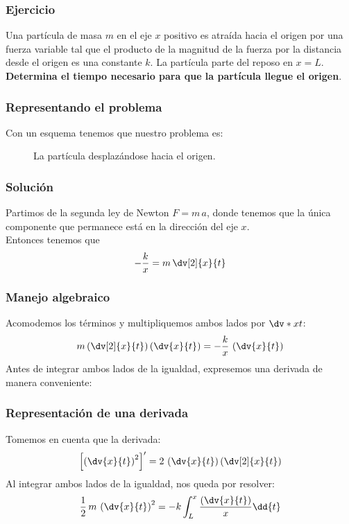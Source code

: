 \begin{frame}
\frametitle{Ejercicio}
Una partícula de masa $m$ en el eje $x$ positivo es atraída hacia el origen por una fuerza variable tal que el producto de la magnitud de la fuerza por la distancia desde el origen es una constante $k$. La partícula parte del reposo en $x = L$.
\\
\bigskip
\pause
\textbf{Determina el tiempo necesario para que la partícula llegue el origen}.
\end{frame}
\begin{frame}
\frametitle{Representando el problema}
Con un esquema tenemos que nuestro problema es:
\begin{figure}
    \centering
    
    \caption{La partícula desplazándose hacia el origen.}
\end{figure}
\end{frame}
\begin{frame}
\frametitle{Solución}
Partimos de la segunda ley de Newton $F = m \, a$, donde tenemos que la única componente que permanece está en la dirección del eje $x$.
\\
\bigskip
\pause
Entonces tenemos que
\begin{align*}
- \dfrac{k}{x} = m \, \dv[2]{x}{t}
\end{align*}
\end{frame}
\begin{frame}
\frametitle{Manejo algebraico}
Acomodemos los términos y multipliquemos ambos lados por $\dv*{x}{t}$:
\begin{align*}
m \left( \dv[2]{x}{t} \right) \left( \dv{x}{t} \right) = - \dfrac{k}{x} \,  \left( \dv{x}{t} \right)
\end{align*}
\pause
Antes de integrar ambos lados de la igualdad, expresemos una derivada de manera conveniente:
\end{frame}
\begin{frame}
\frametitle{Representación de una derivada}
Tomemos en cuenta que la derivada:
\begin{align*}
\left[ \left( \dv{x}{t} \right)^{2} \right]^{\prime} = 2 \, \left( \dv{x}{t} \right) \left( \dv[2]{x}{t} \right)
\end{align*}
\pause
Al integrar ambos lados de la igualdad, nos queda por resolver:
\begin{align*}
\dfrac{1}{2} \, m \, \left( \dv{x}{t} \right)^{2} = - k \int_{L}^{x} \dfrac{\left( \dv{x}{t} \right)}{x} \dd{t}
\end{align*}
\end{frame}
